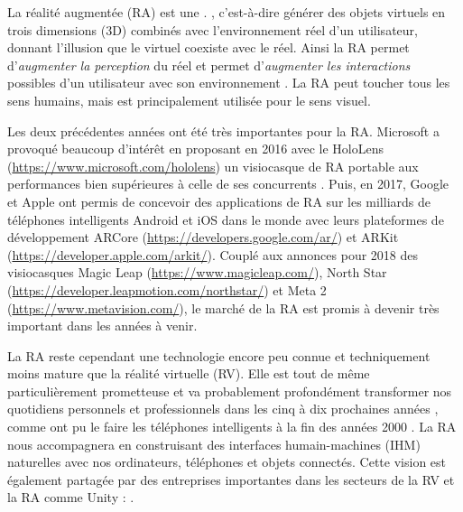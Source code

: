 La réalité augmentée (RA) est une . \citep{OQLFRA2017}, c'est-à-dire générer des objets virtuels en trois dimensions (3D) combinés avec l'environnement réel d'un utilisateur, donnant l'illusion que le virtuel coexiste avec le réel. Ainsi la RA permet d'\emph{augmenter la perception} du réel et permet d'\emph{augmenter les interactions} possibles d'un utilisateur avec son environnement \citep{Azuma1997}. La RA peut toucher tous les sens humains, mais est principalement utilisée pour le sens visuel.


Les deux précédentes années ont été très importantes pour la RA. Microsoft a provoqué beaucoup d'intérêt en proposant en 2016 avec le HoloLens (\url{https://www.microsoft.com/hololens}) un visiocasque de RA portable aux performances bien supérieures à celle de ses concurrents . Puis, en 2017, Google et Apple ont permis de concevoir des applications de RA sur les milliards de téléphones intelligents Android et iOS dans le monde avec leurs plateformes de développement ARCore (\url{https://developers.google.com/ar/}) et ARKit (\url{https://developer.apple.com/arkit/}). Couplé aux annonces pour 2018 des visiocasques Magic Leap (\url{https://www.magicleap.com/}), North Star (\url{https://developer.leapmotion.com/northstar/}) et Meta 2 (\url{https://www.metavision.com/}), le marché de la RA est promis à devenir très important dans les années à venir.


La RA reste cependant une technologie encore peu connue et techniquement moins mature que la réalité virtuelle (RV). Elle est tout de même particulièrement prometteuse et va probablement profondément transformer nos quotidiens personnels et professionnels dans les cinq à dix prochaines années , comme ont pu le faire les téléphones intelligents à la fin des années 2000 \citep{Chaffey2018}. La RA nous accompagnera en construisant des interfaces humain-machines (IHM) naturelles avec nos ordinateurs, téléphones et objets connectés. Cette vision est également partagée par des entreprises importantes dans les secteurs de la RV et la RA comme Unity :  \citep{UnityFutureMRPartIII2017}.

